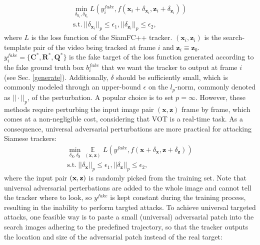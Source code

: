 \documentclass[journal]{IEEEtran}
\begin{document}
\begin{equation}
\begin{gathered}
  \min\limits_{\delta_{\textbf{x}_{i}}, \delta_{\textbf{z}_{i}}} L(y^{fake}_i, f(\textbf{x}_i + \delta_{\textbf{x}_{i}}, \textbf{z}_i + \delta_{\textbf{z}_{i}}))\\
  \text{s.t.}\ ||\delta_{\textbf{x}_i}||_p \le \epsilon_1, ||\delta_{\textbf{z}_i}||_p \le \epsilon_2,
\end{gathered}
\end{equation}
where $L$ is the loss function of the SiamFC++ tracker. $(\textbf{x}_i, \textbf{z}_i)$ is the search-template pair of the video being tracked at frame $i$ and $\textbf{z}_i \equiv \textbf{z}_0$. $y^{fake}_i=\{\textbf{C}^*, \textbf{R}^*, \textbf{Q}^*\}$ is the fake target of the loss function generated according to the fake ground truth box $b^{fake}_i$ that we want the tracker to output at frame $i$ (see Sec. \ref{generate}). 
Additionally, $\delta$ should be sufficiently small, which is commonly modeled through an upper-bound $\epsilon$ on the $l_p\text{-norm}$, commonly denoted as $||\cdot||_p$, of the perturbation. A popular choice is to set $p=\infty$.
However, these methods require perturbing the input image pair $(\textbf{x}, \textbf{z})$ frame by frame, which comes at a non-negligible cost, considering that VOT is a real-time task.
As a consequence, universal adversarial perturbations \cite{UAP, shafahi2020universal} are more practical for attacking Siamese trackers:
\begin{equation}
  \begin{gathered}
    \min\limits_{\delta_\textbf{x}, \delta_\textbf{z}} \mathop{\mathbb{E}}\limits_{(\textbf{x}, \textbf{z})} L(y^{fake}, f(\textbf{x} + \delta_\textbf{x}, \textbf{z} + \delta_\textbf{z}))\\
    \text{s.t.}\ ||\delta_\textbf{x}||_p \le \epsilon_1, ||\delta_\textbf{z}||_p \le \epsilon_2,
  \end{gathered}
\end{equation}  
where the input pair $(\textbf x,\textbf z)$ is randomly picked from the training set. 
Note that universal adversarial perterbations are added to the whole image and cannot tell the tracker where to look, so $y^{fake}$ is kept constant during the training process, resulting in the inability to perform targted attacks.
To achieve universal targeted attacks, one feasible way is to paste a small (universal) adversarial patch into the search images adhering to the predefined trajectory, so that the tracker outputs the location and size of the adversarial patch instead of the real target:
\end{document}

